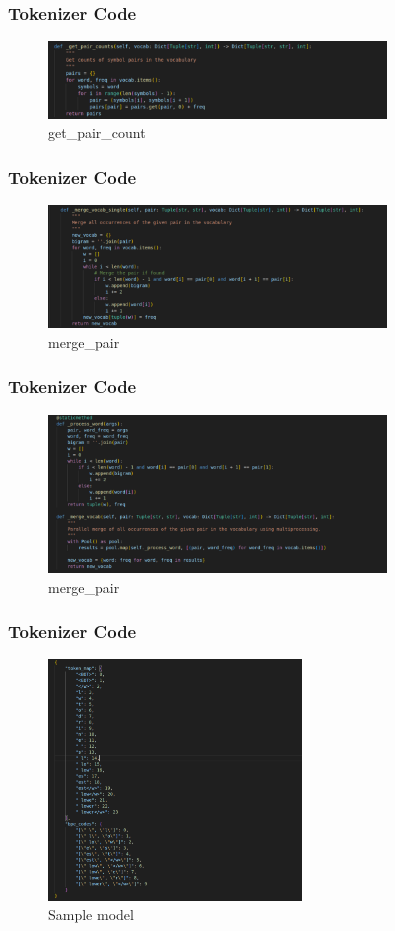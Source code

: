 \documentclass[
    10pt %
    16:9, %
]{beamer}
\begin{document}
\frame
{
  \frametitle{Tokenizer Code}
  \begin{figure}
    \centering
    \includegraphics[width=0.8\textwidth]{get_pair_count.png}
    \caption{get\_pair\_count}
  \end{figure}
}
\frame
{
  \frametitle{Tokenizer Code}
  \begin{figure}
    \centering
    \includegraphics[width=0.8\textwidth]{merge_vocab_single.png}
    \caption{merge\_pair}
  \end{figure}
}
\frame
{
  \frametitle{Tokenizer Code}
  \begin{figure}
    \centering
    \includegraphics[width=0.8\textwidth]{merge_pair.png}
    \caption{merge\_pair}
  \end{figure}
}

\frame
{
  \frametitle{Tokenizer Code}
  \begin{figure}
    \centering
    \includegraphics[width=0.6\textwidth]{tokenized_model.png}
    \caption{Sample model}
  \end{figure}
}
\end{document}
